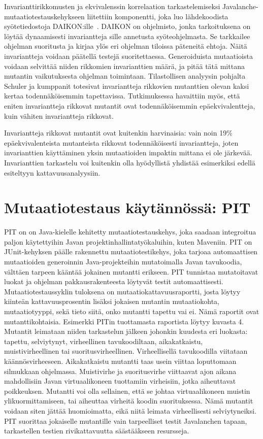 \documentclass[finnish]{tktltiki2}
\begin{document}
Invarianttirikkomusten ja ekvivalenssin korrelaation tarkastelemiseksi Javalanche-mutaatiotestauskehykseen liitettiin komponentti, joka luo lähdekoodista syötetiedostoja DAIKON:ille~\cite{ErnstPGMPTX2007}. DAIKON on ohjelmisto, jonka tarkoituksena on löytää dynaamisesti invariantteja sille annetusta syöteohjelmasta. Se tarkkailee ohjelman suoritusta ja kirjaa ylös eri ohjelman tiloissa päteneitä ehtoja. Näitä invariantteja voidaan päätellä testejä suoritettaessa. Generoiduista mutaatioista voidaan selvittää niiden rikkomien invarianttien määrä, ja pitää tätä mittana mutantin vaikutuksesta ohjelman toimintaan. Tilastollisen analyysin pohjalta Schuler ja kumppanit totesivat invariantteja rikkovien mutanttien olevan kaksi kertaa todennäköisemmin tapettavissa. Tutkimuksessa havaittiin myös, että eniten invariantteja rikkovat mutantit ovat todennäköisemmin epäekvivalentteja, kuin vähiten invariantteja rikkovat. 

Invariantteja rikkovat mutantit ovat kuitenkin harvinaisia: vain noin 19\% epäekvivalenteista mutanteista rikkovat todennäköisesti invariantteja, joten invarianttien käyttäminen yksin mutaatioiden impaktin mittana ei ole järkevää. Invarianttien tarkastelu voi kuitenkin olla hyödyllistä yhdistää esimerkiksi edellä esiteltyyn kattavuusanalyysiin.

\section{Mutaatiotestaus käytännössä: PIT}
PIT on on Java-kielelle kehitetty mutaatiotestauskehys, joka saadaan integroitua paljon käytettyihin Javan projektinhallintatyökaluihin, kuten Maveniin. PIT on JUnit-kehyksen päälle rakennettu mutaatiotestikehys, joka tarjoaa automaattisen mutaatioiden generoinnin Java-projekteihin mutatoimalla Javan tavukoodia, välttäen tarpeen kääntää jokainen mutantti erikseen. PIT tunnistaa mutatoitavat luokat ja ohjelman pakkausrakenteesta löytyvät testit automaattisesti. Mutaatiotestaussyklin tuloksena on mutaatiokattavuusraportti, josta löytyy kiinteän kattavuusprosentin lisäksi jokaisen mutantin mutaatiokohta, mutaatiotyyppi, sekä tieto siitä, onko mutantti tapettu vai ei. Nämä raportit ovat mutanttikohtaisia. Esimerkki PITin tuottamasta raportista löytyy kuvasta 4. Mutantit leimataan niiden tarkastelun jälkeen johonkin kuudesta eri luokasta: tapettu, selviytynyt, virheellinen tavukoodiltaan, aikakatkaistu, muistivirheellinen tai suoritusvirheellinen. Virheellisellä tavukoodilla viitataan käännösvirheeseen. Aikakatkaistu mutantti taas usein viittaa loputtomaan silmukkaan ohjelmassa. Muistivirhe ja suoritusvirhe viittaavat ajon aikana mahdollisiin Javan virtuaalikoneen tuottamiin virheisiin, jotka aiheuttavat poikkeuksen. Mutantti voi olla sellainen, että se johtaa virtuaalikoneen muistin ylikuormittamiseen, tai aiheuttaa virheitä koodin suorituksessa. Nämä mutantit voidaan siten jättää huomioimatta, eikä niitä leimata virheellisesti selviytyneiksi. PIT suorittaa jokaiselle mutantille vain tarpeelliset testit Javalanchen tapaan, tarkastellen testien rivikattavuutta säästääkseen resursseja.
\end{document}

